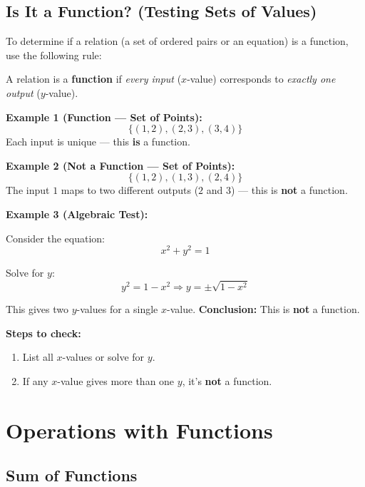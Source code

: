 \documentclass[11pt]{article}
\begin{document}
\subsection{Is It a Function? (Testing Sets of Values)}

To determine if a relation (a set of ordered pairs or an equation) is a function, use the following rule:

\begin{tcolorbox}[colback=yellow!5!white, colframe=yellow!80!black, title=Function Test]
A relation is a \textbf{function} if \emph{every input} (\( x \)-value) corresponds to \emph{exactly one output} (\( y \)-value).
\end{tcolorbox}

\textbf{Example 1 (Function — Set of Points):}
\[
\{ (1, 2), (2, 3), (3, 4) \}
\]
Each input is unique — this \textbf{is} a function.

\medskip

\textbf{Example 2 (Not a Function — Set of Points):}
\[
\{ (1, 2), (1, 3), (2, 4) \}
\]
The input \( 1 \) maps to two different outputs (\( 2 \) and \( 3 \)) — this is \textbf{not} a function.

\bigskip

\textbf{Example 3 (Algebraic Test):}

Consider the equation:
\[
x^2 + y^2 = 1
\]

Solve for \( y \):
\[
y^2 = 1 - x^2 \Rightarrow y = \pm \sqrt{1 - x^2}
\]

This gives two \( y \)-values for a single \( x \)-value.
\textbf{Conclusion:} This is \textbf{not} a function.

\bigskip

\textbf{Steps to check:}
\begin{enumerate}
  \item List all \( x \)-values or solve for \( y \).
  \item If any \( x \)-value gives more than one \( y \), it's \textbf{not} a function.
\end{enumerate}

\section{Operations with Functions}

\subsection{Sum of Functions}
\end{document}
